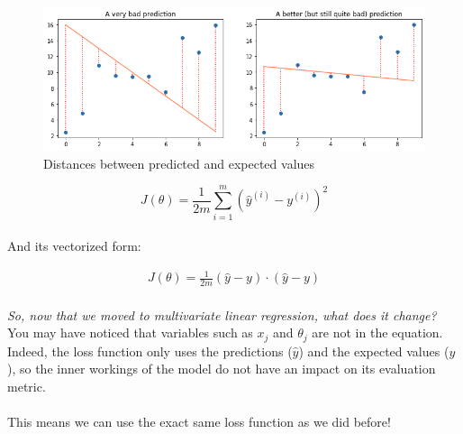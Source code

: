 \begin{figure}[!h]
    \centering
    \includegraphics[scale=0.5]{assets/bad_pred_with_distance.png}
    \caption{Distances between predicted and expected values}
\end{figure}
\newpage
{}

$$
J(\theta) = \frac{1}{2m}\sum_{i=1}^{m}(\hat{y}^{(i)} - y^{(i)})^2
$$
\\
And its vectorized form:

$$
\begin{matrix}
J(\theta) = \frac{1}{2m}(\hat{y} - y)\cdot(\hat{y}- y)
\end{matrix}
$$
\\
\textit{So, now that we moved to multivariate linear regression, what does it change?}\\
\newline
You may have noticed that variables such as $x_j$ and $\theta_j$ are not in the equation.
Indeed, the loss function only uses the predictions ($\hat{y}$) and the expected values ($y$), 
so the inner workings of the model do not have an impact on its evaluation metric.\\
\\
This means we can use the exact same loss function as we did before!
